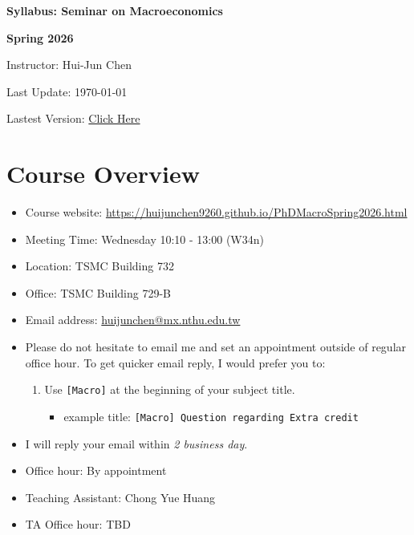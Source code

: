 \documentclass[12pt]{article}
\begin{document}
\centerline{\huge\bf Syllabus: Seminar on Macroeconomics}
\medskip
\centerline{\LARGE \bf Spring 2026}
\medskip
\centerline{\Large Instructor: Hui-Jun Chen}
\centerline{Last Update: \today}
\centerline{Lastest Version: \href{https://huijunchen9260.github.io/pdf/PhDMacroSpring2026/syllabus/syllabus.pdf}{Click Here}}

\medskip



\section*{Course Overview}
\begin{itemize}

    \item Course website: \href{https://huijunchen9260.github.io/PhDMacroSpring2026.html}{https://huijunchen9260.github.io/PhDMacroSpring2026.html}
    \item Meeting Time: Wednesday 10:10 - 13:00 (W34n)
    \item Location: TSMC Building 732
    \item Office: TSMC Building 729-B
    \item Email address: \href{huijunchen@mx.nthu.edu.tw}{huijunchen@mx.nthu.edu.tw}
    \item Please do not hesitate to email me and set an appointment outside of regular office hour.
To get quicker email reply, I would prefer you to:
    \begin{enumerate}
        \item Use \texttt{[Macro]} at the beginning of your subject title.
\begin{itemize}
            \item example title: \texttt{[Macro] Question regarding Extra credit}
        \end{itemize}
    \end{enumerate}
    \item I will reply your email within \textit{2 business day}.
\item Office hour: By appointment
    \item Teaching Assistant: Chong Yue Huang
    \item TA Office hour: TBD
\end{itemize}
\end{document}
